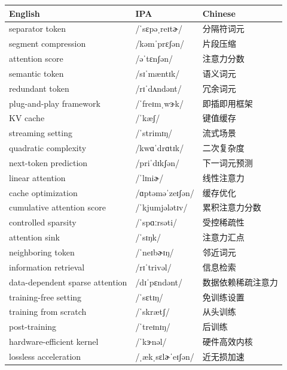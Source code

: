 \documentclass[UTF8,12pt,a4paper]{ctexart}
\providecommand{\zh}[1]{#1}
\begin{document}
\begin{tabular*}{\textwidth}{@{\extracolsep{\fill}}lll@{}}
\toprule
\textbf{English} & \textbf{IPA} & \textbf{Chinese} \\
\midrule
separator token & {\ipafont /ˈsɛpəˌreɪtɚ/} & \zh{分隔符词元} \\
segment compression & {\ipafont /kəmˈprɛʃən/} & \zh{片段压缩} \\
attention score & {\ipafont /əˈtɛnʃən/} & \zh{注意力分数} \\
semantic token & {\ipafont /sɪˈmæntɪk/} & \zh{语义词元} \\
redundant token & {\ipafont /rɪˈdʌndənt/} & \zh{冗余词元} \\
plug-and-play framework & {\ipafont /ˈfreɪmˌwɝk/} & \zh{即插即用框架} \\
KV cache & {\ipafont /ˈkæʃ/} & \zh{键值缓存} \\
streaming setting & {\ipafont /ˈstrimɪŋ/} & \zh{流式场景} \\
quadratic complexity & {\ipafont /kwɑˈdrɑtɪk/} & \zh{二次复杂度} \\
next-token prediction & {\ipafont /priˈdɪkʃən/} & \zh{下一词元预测} \\
linear attention & {\ipafont /ˈlɪniɚ/} & \zh{线性注意力} \\
cache optimization & {\ipafont /ɑptəməˈzeɪʃən/} & \zh{缓存优化} \\
cumulative attention score & {\ipafont /ˈkjumjələtɪv/} & \zh{累积注意力分数} \\
controlled sparsity & {\ipafont /ˈspɑːrsəti/} & \zh{受控稀疏性} \\
attention sink & {\ipafont /ˈsɪŋk/} & \zh{注意力汇点} \\
neighboring token & {\ipafont /ˈneɪbɚɪŋ/} & \zh{邻近词元} \\
information retrieval & {\ipafont /rɪˈtrivəl/} & \zh{信息检索} \\
data-dependent sparse attention & {\ipafont /dɪˈpɛndənt/} & \zh{数据依赖稀疏注意力} \\
training-free setting & {\ipafont /ˈsɛtɪŋ/} & \zh{免训练设置} \\
training from scratch & {\ipafont /ˈskrætʃ/} & \zh{从头训练} \\
post-training & {\ipafont /ˈtreɪnɪŋ/} & \zh{后训练} \\
hardware-efficient kernel & {\ipafont /ˈkɝnəl/} & \zh{硬件高效内核} \\
lossless acceleration & {\ipafont /ˌækˌsɛlɚˈeɪʃən/} & \zh{近无损加速} \\

\end{tabular*}
\end{document}
